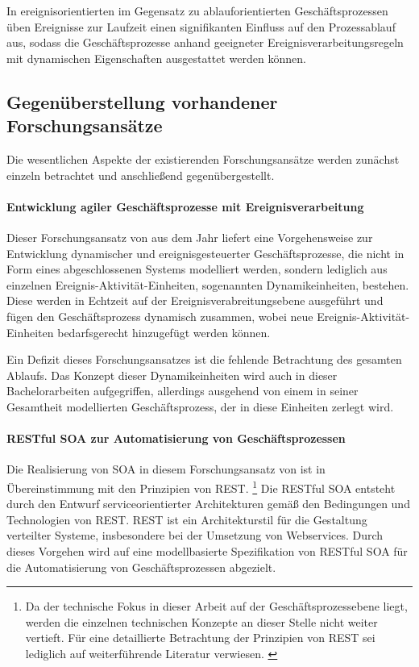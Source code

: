 In ereignisorientierten im Gegensatz zu ablauforientierten Geschäftsprozessen üben Ereignisse zur Laufzeit einen signifikanten Einfluss auf den Prozessablauf aus, sodass die Geschäftsprozesse anhand geeigneter Ereignisverarbeitungsregeln mit dynamischen Eigenschaften ausgestattet werden können. 

\subsection{Gegenüberstellung vorhandener Forschungsansätze}
Die wesentlichen Aspekte der existierenden Forschungsansätze werden zunächst einzeln betrachtet und anschließend gegenübergestellt.

\paragraph{Entwicklung agiler Geschäftsprozesse mit Ereignisverarbeitung}
Dieser Forschungsansatz von \citeauthor{Alexopoulou.2008} aus dem Jahr \citeyear{Alexopoulou.2008} liefert eine Vorgehensweise zur Entwicklung dynamischer und ereignisgesteuerter Geschäftsprozesse, die nicht in Form eines abgeschlossenen Systems modelliert werden, sondern lediglich aus einzelnen Ereignis-Aktivität-Einheiten, sogenannten Dynamikeinheiten, bestehen. 
\cite{Alexopoulou.2008} 
Diese werden in Echtzeit auf der Ereignisverabreitungsebene ausgeführt und fügen den Geschäftsprozess dynamisch zusammen, wobei neue Ereignis-Aktivität-Einheiten bedarfsgerecht hinzugefügt werden können. 

Ein Defizit dieses Forschungsansatzes ist die fehlende Betrachtung des gesamten Ablaufs. Das Konzept dieser Dynamikeinheiten wird auch in dieser Bachelorarbeiten aufgegriffen, allerdings ausgehend von einem in seiner Gesamtheit modellierten Geschäftsprozess, der in diese Einheiten zerlegt wird.

\paragraph{RESTful SOA zur Automatisierung von Geschäftsprozessen}
Die Realisierung von \ac{SOA} in diesem Forschungsansatz von \citeauthor{Wolf.2016} ist in Übereinstimmung mit den Prinzipien von \ac{REST}. 
\footnote{
Da der technische Fokus in dieser Arbeit auf der Geschäftsprozessebene liegt, werden die einzelnen technischen Konzepte an dieser Stelle nicht weiter vertieft.
Für eine detaillierte Betrachtung der Prinzipien von \ac{REST} sei lediglich auf weiterführende Literatur verwiesen.
\cite{Wolf.2016}\cite{Masak.2007}\cite{Finger.2009}}
Die \ac{REST}ful \ac{SOA} entsteht durch den Entwurf serviceorientierter Architekturen gemäß den Bedingungen und Technologien von \ac{REST}. \ac{REST} ist ein Architekturstil für die Gestaltung verteilter Systeme, insbesondere bei der Umsetzung von Webservices. Durch dieses Vorgehen wird auf eine modellbasierte Spezifikation von \ac{REST}ful \ac{SOA} für die Automatisierung von Geschäftsprozessen abgezielt. \cite{Wolf.2016}

